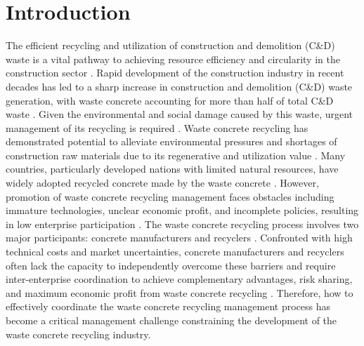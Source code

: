 \documentclass[authoryear,preprint,review,times,10pt]{elsarticle}
\begin{document}
\section{Introduction}
The efficient recycling and utilization of construction and demolition (C\&D) waste is a vital pathway to achieving resource efficiency and circularity in the construction sector \citep{yuan2025Exploring}. Rapid development of the construction industry in recent decades has led to a sharp increase in construction and demolition (C\&D) waste generation, with waste concrete accounting for more than half of total C\&D waste \citep{zhao2020Use}. Given the environmental and social damage caused by this waste, urgent management of its recycling is required \citep{wu2019Offsite}. Waste concrete recycling has demonstrated potential to alleviate environmental pressures and shortages of construction raw materials due to its regenerative and utilization value \citep{mostert2021Climate}. Many countries, particularly developed nations with limited natural resources, have widely adopted recycled concrete made by the waste concrete \citep{yenipazarli2019Incentives}. However, promotion of waste concrete recycling management faces obstacles including immature technologies, unclear economic profit, and incomplete policies, resulting in low enterprise participation \citep{liu2021Explore,ma2020Challenges}. The waste concrete recycling process involves two major participants: concrete manufacturers and recyclers \citep{he2020Investigation,lu2015Stakeholders}. Confronted with high technical costs and market uncertainties, concrete manufacturers and recyclers often lack the capacity to independently overcome these barriers and require inter-enterprise coordination to achieve complementary advantages, risk sharing, and maximum economic profit from waste concrete recycling \citep{bao2019Procurement}. Therefore, how to effectively coordinate the waste concrete recycling management process has become a critical management challenge constraining the development of the waste concrete recycling industry.
\end{document}
